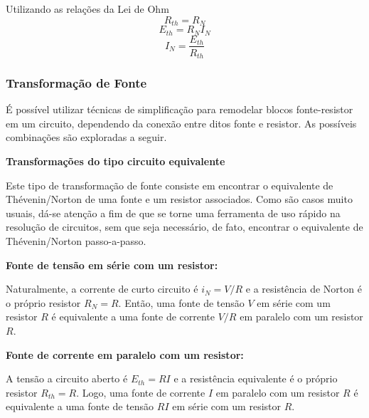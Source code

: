 \documentclass{article}
\numberwithin{equation}{section}
\begin{document}
Utilizando as relações da Lei de Ohm
$$ R_{th}=R_{N} $$
\begin{equation}
    E_{th}=R_{N}I_{N}
\end{equation}
\begin{equation}
    I_{N}=\frac{E_{th}}{R_{th}}
\end{equation}

\subsubsection{Transformação de Fonte}
\label{subsubsec:transform}
É possível utilizar técnicas de simplificação para remodelar blocos fonte-resistor em um circuito, dependendo da conexão entre ditos fonte e resistor. As possíveis combinações são exploradas a seguir.
\vspace{5mm}

\noindent\textbf{Transformações do tipo circuito equivalente}
\vspace{3mm}

Este tipo de transformação de fonte consiste em encontrar o equivalente de Thévenin/Norton de uma fonte e um resistor associados. Como são casos muito usuais, dá-se atenção a fim de que se torne uma ferramenta de uso rápido na resolução de circuitos, sem que seja necessário, de fato, encontrar o equivalente de Thévenin/Norton passo-a-passo.

\vspace{3mm}

\textbf{\small{\textbullet} Fonte de tensão em série com um resistor:}
\begin{center}
\end{center}

\noindent Naturalmente, a corrente de curto circuito é $i_{N}=V/R$ e a resistência de Norton é o próprio resistor $R_{N}=R$. Então, uma fonte de tensão $V$ em série com um resistor $R$ é equivalente a uma fonte de corrente $V/R$ em paralelo com um resistor $R$.

\vspace{3mm}

\textbf{\small{\textbullet} Fonte de corrente em paralelo com um resistor:}
\begin{center}
\end{center}
A tensão a circuito aberto é $E_{th}=RI$ e a resistência equivalente é o próprio resistor $R_{th}=R$. Logo, uma fonte de corrente $I$ em paralelo com um resistor $R$ é equivalente a uma fonte de tensão $RI$ em série com um resistor $R$.
\end{document}
